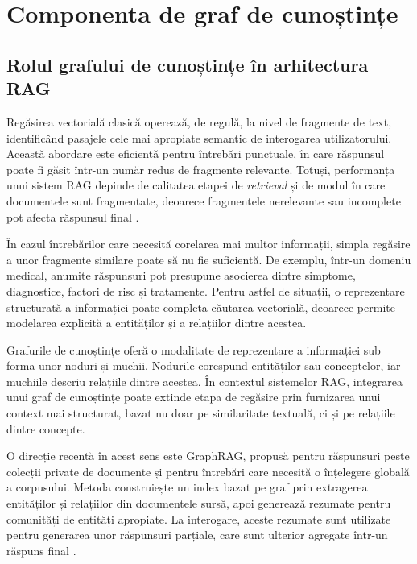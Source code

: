 \documentclass[12pt, a4paper, oneside, romanian]{teza-upb}
\begin{document}
\section{Componenta de graf de cunoștințe}

\subsection{Rolul grafului de cunoștințe în arhitectura RAG}

Regăsirea vectorială clasică operează, de regulă, la nivel de fragmente de text, identificând pasajele cele mai apropiate semantic de interogarea utilizatorului. Această abordare este eficientă pentru întrebări punctuale, în care răspunsul poate fi găsit într-un număr redus de fragmente relevante. Totuși, performanța unui sistem RAG depinde de calitatea etapei de \textit{retrieval} și de modul în care documentele sunt fragmentate, deoarece fragmentele nerelevante sau incomplete pot afecta răspunsul final \cite{gao2023retrieval}.

În cazul întrebărilor care necesită corelarea mai multor informații, simpla regăsire a unor fragmente similare poate să nu fie suficientă. De exemplu, într-un domeniu medical, anumite răspunsuri pot presupune asocierea dintre simptome, diagnostice, factori de risc și tratamente. Pentru astfel de situații, o reprezentare structurată a informației poate completa căutarea vectorială, deoarece permite modelarea explicită a entităților și a relațiilor dintre acestea.

Grafurile de cunoștințe oferă o modalitate de reprezentare a informației sub forma unor noduri și muchii. Nodurile corespund entităților sau conceptelor, iar muchiile descriu relațiile dintre acestea. În contextul sistemelor RAG, integrarea unui graf de cunoștințe poate extinde etapa de regăsire prin furnizarea unui context mai structurat, bazat nu doar pe similaritate textuală, ci și pe relațiile dintre concepte.

O direcție recentă în acest sens este GraphRAG, propusă pentru răspunsuri peste colecții private de documente și pentru întrebări care necesită o înțelegere globală a corpusului. Metoda construiește un index bazat pe graf prin extragerea entităților și relațiilor din documentele sursă, apoi generează rezumate pentru comunități de entități apropiate. La interogare, aceste rezumate sunt utilizate pentru generarea unor răspunsuri parțiale, care sunt ulterior agregate într-un răspuns final \cite{edge2024local}.
\end{document}
